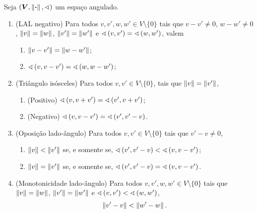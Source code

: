 \begin{proposition}
Seja $(\bm V, \nor{\var},\angf)$ um espaço angulado.
	\begin{enumerate}
		\item (LAL negativo) Para todos $v,v',w,w' \in V \setminus \{0\}$ tais que $v-v' \neq 0$, $w-w' \neq 0$, $\nor{v}=\nor{w}$, $\nor{v'}=\nor{w'}$ e $\ang{v}{v'}=\ang{w}{w'}$, valem
			\begin{enumerate}
			\item $\nor{v-v'}=\nor{w-w'}$;
			\item $\ang{v}{v-v'}=\ang{w}{w-w'}$;
			\end{enumerate}
		\item (Triângulo isósceles) Para todos $v,v' \in V \setminus \{0\}$, tais que $\nor{v}=\nor{v'}$,
			\begin{enumerate}
			\item (Positivo) $\ang{v}{v+v'} = \ang{v'}{v+v'}$;
			\item (Negativo) $\ang{v}{v-v'} = \ang{v'}{v'-v}$.
			\end{enumerate}
		
		\item (Oposição lado-ângulo) Para todos $v,v' \in V \setminus \{0\}$ tais que $v'-v \neq 0$,
			\begin{enumerate}
			\item $\nor{v}<\nor{v'}$ se, e somente se, $\ang{v'}{v'-v} < \ang{v}{v-v'}$;
			\item $\nor{v}=\nor{v'}$ se, e somente se, $\ang{v'}{v'-v} = \ang{v}{v-v'}$.
			\end{enumerate}
		
		\item (Monotonicidade lado-ângulo) Para todos $v,v',w,w' \in V \setminus \{0\}$ tais que $\nor{v}=\nor{w}$, $\nor{v'}=\nor{w'}$ e $\ang{v}{v'} < \ang{w}{w'}$,
			\begin{equation*}
			\nor{v'-v} < \nor{w'-w}.
			\end{equation*}
	\end{enumerate}
\end{proposition}
